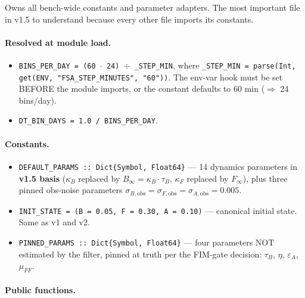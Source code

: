 \documentclass[11pt,a4paper]{article}
\begin{document}
Owns all bench-wide constants and parameter adapters. The most
important file in v1.5 to understand because every other file
imports its constants.

\paragraph{Resolved at module load.}

\begin{itemize}[itemsep=2pt,leftmargin=*]
\item \texttt{BINS\_PER\_DAY = (60 $\cdot$ 24) $\div$
  \_STEP\_MIN}, where \texttt{\_STEP\_MIN = parse(Int,
  get(ENV, "FSA\_STEP\_MINUTES", "60"))}. The env-var hook
  must be set BEFORE the module imports, or the constant
  defaults to 60 min ($\Rightarrow$ 24 bins/day).
\item \texttt{DT\_BIN\_DAYS = 1.0 / BINS\_PER\_DAY}.
\end{itemize}

\paragraph{Constants.}

\begin{itemize}[itemsep=2pt,leftmargin=*]
\item \texttt{DEFAULT\_PARAMS :: Dict\{Symbol, Float64\}} --- 14
  dynamics parameters in \textbf{v1.5 basis} ($\kappa_B$ replaced by
  $B_\infty = \kappa_B \cdot \tau_B$, $\kappa_F$ replaced by $F_\infty$),
  plus three pinned obs-noise parameters
  $\sigma_{B,\text{obs}} = \sigma_{F,\text{obs}} = \sigma_{A,\text{obs}}
  = 0.005$.

\item \texttt{INIT\_STATE = (B = 0.05, F = 0.30, A = 0.10)} ---
  canonical initial state. Same as v1 and v2.

\item \texttt{PINNED\_PARAMS :: Dict\{Symbol, Float64\}} --- four
  parameters NOT estimated by the filter, pinned at truth per the
  FIM-gate decision: $\tau_B$, $\eta$, $\varepsilon_A$, $\mu_{FF}$.
\end{itemize}

\paragraph{Public functions.}
\end{document}
